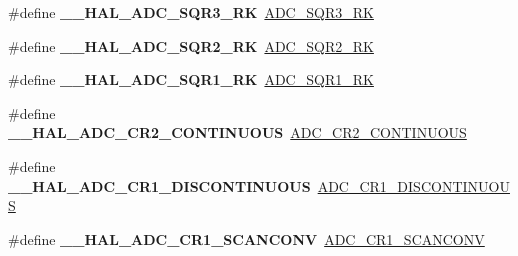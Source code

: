 \begin{DoxyCompactItemize}
\mbox{\label{group___h_a_l___a_d_c___aliased___macros_ga999c539ac6b3b5ab766461e70dadf0a2}} 
\#define {\bfseries \+\_\+\+\_\+\+H\+A\+L\+\_\+\+A\+D\+C\+\_\+\+S\+Q\+R3\+\_\+\+RK}~\mbox{\hyperlink{group___a_d_c___private___macros_ga173aa2d3480ddaac12fe6a853bead899}{A\+D\+C\+\_\+\+S\+Q\+R3\+\_\+\+RK}}
\item 
\mbox{\label{group___h_a_l___a_d_c___aliased___macros_ga6821ae59c39afefd2644d278974b2ab6}} 
\#define {\bfseries \+\_\+\+\_\+\+H\+A\+L\+\_\+\+A\+D\+C\+\_\+\+S\+Q\+R2\+\_\+\+RK}~\mbox{\hyperlink{group___a_d_c___private___macros_gad07a38a5b6d28f23ecbe027222f59bd0}{A\+D\+C\+\_\+\+S\+Q\+R2\+\_\+\+RK}}
\item 
\mbox{\label{group___h_a_l___a_d_c___aliased___macros_ga907ae83ff38403071ff564a44d5ad3cb}} 
\#define {\bfseries \+\_\+\+\_\+\+H\+A\+L\+\_\+\+A\+D\+C\+\_\+\+S\+Q\+R1\+\_\+\+RK}~\mbox{\hyperlink{group___a_d_c___private___macros_ga89869cd79b14d222a9b235bd150fc512}{A\+D\+C\+\_\+\+S\+Q\+R1\+\_\+\+RK}}
\item 
\mbox{\label{group___h_a_l___a_d_c___aliased___macros_ga8b8d36727b15f9d630f633e453c8dc59}} 
\#define {\bfseries \+\_\+\+\_\+\+H\+A\+L\+\_\+\+A\+D\+C\+\_\+\+C\+R2\+\_\+\+C\+O\+N\+T\+I\+N\+U\+O\+US}~\mbox{\hyperlink{group___a_d_c___private___macros_gae92924f248b2fd7693ce648275a8087c}{A\+D\+C\+\_\+\+C\+R2\+\_\+\+C\+O\+N\+T\+I\+N\+U\+O\+US}}
\item 
\mbox{\label{group___h_a_l___a_d_c___aliased___macros_ga0906f1443571a5dc173f0a1561f514f4}} 
\#define {\bfseries \+\_\+\+\_\+\+H\+A\+L\+\_\+\+A\+D\+C\+\_\+\+C\+R1\+\_\+\+D\+I\+S\+C\+O\+N\+T\+I\+N\+U\+O\+US}~\mbox{\hyperlink{group___a_d_c___private___macros_ga5b8b6fe1d24684616ccf43b8e5e0ef23}{A\+D\+C\+\_\+\+C\+R1\+\_\+\+D\+I\+S\+C\+O\+N\+T\+I\+N\+U\+O\+US}}
\item 
\mbox{\label{group___h_a_l___a_d_c___aliased___macros_ga92d473f3afb5552b6e4a710410fcb2f1}} 
\#define {\bfseries \+\_\+\+\_\+\+H\+A\+L\+\_\+\+A\+D\+C\+\_\+\+C\+R1\+\_\+\+S\+C\+A\+N\+C\+O\+NV}~\mbox{\hyperlink{group___a_d_c___private___macros_gad46aba92287da828c570fab3599e38c2}{A\+D\+C\+\_\+\+C\+R1\+\_\+\+S\+C\+A\+N\+C\+O\+NV}}

\end{DoxyCompactItemize}
